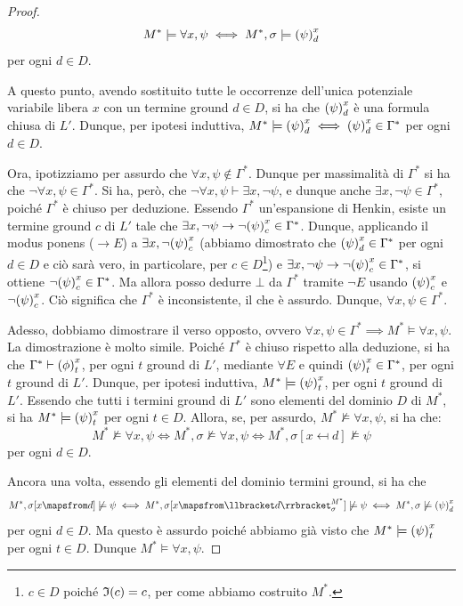 \begin{proof}
  \[M^* \models \forall x, \psi \iff M^*,\sigma \models {{\left(\psi\right)}^{x}_{d}}\]
  per ogni \(d \in D\).

  A questo punto, avendo sostituito tutte le occorrenze dell'unica potenziale variabile libera \(x\) con un termine ground \(d \in D\), si ha che \({{\left(\psi\right)}^{x}_{d}}\) è una formula chiusa di \(L'\). Dunque, per ipotesi induttiva, \(M^* \models {{\left(\psi\right)}^{x}_{d}} \iff {{\left(\psi\right)}^{x}_{d}} \in \Gamma^*\) per ogni \(d\in D\).

  Ora, ipotizziamo per assurdo che \(\forall x, \psi \notin \Gamma^*\). Dunque per massimalità di \(\Gamma^*\) si ha che \(\neg \forall x, \psi \in \Gamma^*\). Si ha, però, che \(\neg \forall x, \psi\vdash \exists x, \neg \psi\), e dunque anche \(\exists x, \neg \psi \in \Gamma^*\), poiché \(\Gamma^*\) è chiuso per deduzione. Essendo \(\Gamma^*\) un'espansione di Henkin, esiste un termine ground \(c\) di \(L'\) tale che \(\exists x, \neg \psi \to \neg {{\left(\psi\right)}^{x}_{c}} \in \Gamma^*\). Dunque, applicando il modus ponens (\(\to E\)) a \(\exists x, \neg {{\left(\psi\right)}^{x}_{c}}\) (abbiamo dimostrato che \({{\left(\psi\right)}^{x}_{d}} \in \Gamma^*\) per ogni \(d\in D\) e ciò sarà vero, in particolare, per \(c \in D\)\footnote{\(c \in D\) poiché \(\mathfrak{I}(c)=c\), per come abbiamo costruito \(M^*\).}) e \(\exists x, \neg \psi \to \neg {{\left(\psi\right)}^{x}_{c}} \in \Gamma^*\), si ottiene \(\neg {{\left(\psi\right)}^{x}_{c}} \in \Gamma^*\). Ma allora posso dedurre \(\bot\) da \(\Gamma^*\) tramite \(\neg E\) usando \({{\left(\psi\right)}^{x}_{c}}\) e \(\neg {{\left(\psi\right)}^{x}_{c}}\). Ciò significa che \(\Gamma^*\) è inconsistente, il che è assurdo. Dunque, \(\forall x, \psi \in \Gamma^*\).

  Adesso, dobbiamo dimostrare il verso opposto, ovvero \(\forall x, \psi \in \Gamma^*\implies M^* \models \forall x, \psi\). La dimostrazione è molto simile.
  Poiché \(\Gamma^*\) è chiuso rispetto alla deduzione, si ha che \(\Gamma^* \vdash {{\left(\phi\right)}^{x}_{t}}\), per ogni \(t\) ground di \(L'\), mediante \(\forall E\) e quindi \({{\left(\psi\right)}^{x}_{t}} \in \Gamma^*\), per ogni \(t\) ground di \(L'\). Dunque, per ipotesi induttiva, \(M^* \models {{\left(\psi\right)}^{x}_{t}}\), per ogni \(t\) ground di \(L'\). Essendo che tutti i termini ground di \(L'\) sono elementi del dominio \(D\) di \(M^*\), si ha \(M^* \models {{\left(\psi\right)}^{x}_{t}}\) per ogni \(t\in D\). Allora, se, per assurdo, \(M^* \not\models \forall x, \psi\), si ha che:
  \[M^* \not\models \forall x, \psi \iff M^* ,\sigma \not\models \forall x, \psi \iff M^*,\sigma[x\mapsfrom d] \not\models \psi\]
  per ogni \(d \in D\).

  Ancora una volta, essendo gli elementi del dominio termini ground, si ha che
  \[M^* ,\sigma[x\mapsfrom d] \not\models \psi \iff M^* ,\sigma[x \mapsfrom \den{d}[M^*][\sigma]] \not\models \psi  \iff M^*,\sigma \not\models \subs{\psi}{x}{d}\]
  per ogni \(d\in D\). Ma questo è assurdo poiché abbiamo già visto che \(M^* \models {{\left(\psi\right)}^{x}_{t}}\) per ogni \(t\in D\). Dunque \(M^* \models \forall x, \psi\).
\end{proof}

